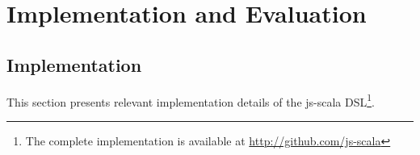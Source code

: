 \documentclass[american,english,runningheads]{llncs}
\newcommand{\eg}{\emph{e.g.}}
\begin{document}
% 
% 
% 
% 
% 
% 

\section{Implementation and Evaluation}
\label{validation}

\subsection{Implementation}
\label{implementation}

This section presents relevant implementation details of the js-scala DSL\footnote{The complete implementation is
available at \href{http://github.com/js-scala}{http://github.com/js-scala}}.
\end{document}
